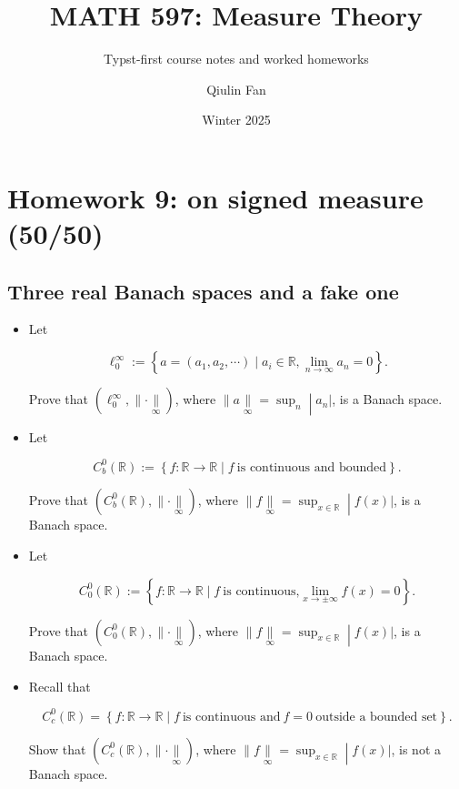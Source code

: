 \documentclass{qlnotes-export}
\title{MATH 597: Measure Theory}
\subtitle{Typst-first course notes and worked homeworks}
\author{Qiulin Fan}
\date{Winter 2025}
\begin{document}
\mainmatter
\chapter{Homework 9: on signed measure (50/50)}\label{homework-9-on-signed-measure-5050}

\section{Three real Banach spaces and a fake one}\label{three-real-banach-spaces-and-a-fake-one}

\begin{itemize}
\item
  Let

  \[\ell_{0}^{\infty} := \left\{ {a = (a_{1},a_{2},\cdots) \mid a_{i} \in {\mathbb{R}},\lim\limits_{n\rightarrow\infty}a_{n} = 0} \right\}.\]

  Prove that \((\ell_{0}^{\infty}, \parallel \cdot \underset{\infty}{\parallel})\), where \(\left. \parallel a\underset{\infty}{\parallel} = \sup_{n} \middle| a_{n}| \right.\), is a Banach space.
\item
  Let

  \[C_{b}^{0}({\mathbb{R}}) := \left\{ {f:{\mathbb{R}}\rightarrow{\mathbb{R}} \mid f\ \text{is continuous and bounded}} \right\}.\]

  Prove that \((C_{b}^{0}({\mathbb{R}}), \parallel \cdot \underset{\infty}{\parallel})\), where \(\left. \parallel f\underset{\infty}{\parallel} = \sup_{x \in {\mathbb{R}}} \middle| f(x)| \right.\), is a Banach space.
\item
  Let

  \[C_{0}^{0}({\mathbb{R}}) := \left\{ {f:{\mathbb{R}}\rightarrow{\mathbb{R}} \mid f\ \text{is continuous,}\lim\limits_{x\rightarrow \pm \infty}f(x) = 0} \right\}.\]

  Prove that \((C_{0}^{0}({\mathbb{R}}), \parallel \cdot \underset{\infty}{\parallel})\), where \(\left. \parallel f\underset{\infty}{\parallel} = \sup_{x \in {\mathbb{R}}} \middle| f(x)| \right.\), is a Banach space.
\item
  Recall that

  \[C_{c}^{0}({\mathbb{R}}) = \left\{ {f:{\mathbb{R}}\rightarrow{\mathbb{R}} \mid f\ \text{is continuous and}\ f = 0\ \text{outside a bounded set}} \right\}.\]

  Show that \((C_{c}^{0}({\mathbb{R}}), \parallel \cdot \underset{\infty}{\parallel})\), where \(\left. \parallel f\underset{\infty}{\parallel} = \sup_{x \in {\mathbb{R}}} \middle| f(x)| \right.\), is not a Banach space.
\end{itemize}
\end{document}

